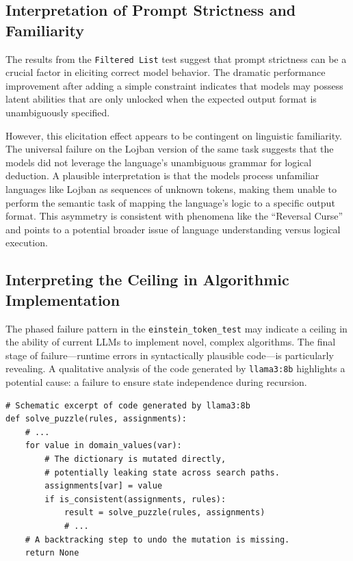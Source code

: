\documentclass[11pt]{article}
\begin{document}
\subsection{Interpretation of Prompt Strictness and Familiarity}
The results from the \texttt{Filtered List} test suggest that prompt strictness can be a crucial factor in eliciting correct model behavior. The dramatic performance improvement after adding a simple constraint indicates that models may possess latent abilities that are only unlocked when the expected output format is unambiguously specified.

However, this elicitation effect appears to be contingent on linguistic familiarity. The universal failure on the Lojban version of the same task suggests that the models did not leverage the language's unambiguous grammar for logical deduction. A plausible interpretation is that the models process unfamiliar languages like Lojban as sequences of unknown tokens, making them unable to perform the semantic task of mapping the language's logic to a specific output format. This asymmetry is consistent with phenomena like the ``Reversal Curse'' \cite{berglund2023reversal} and points to a potential broader issue of language understanding versus logical execution.

\subsection{Interpreting the Ceiling in Algorithmic Implementation}
The phased failure pattern in the \texttt{einstein\_token\_test} may indicate a ceiling in the ability of current LLMs to implement novel, complex algorithms. The final stage of failure---runtime errors in syntactically plausible code---is particularly revealing. A qualitative analysis of the code generated by \texttt{llama3:8b} highlights a potential cause: a failure to ensure state independence during recursion.

\begin{verbatim}
# Schematic excerpt of code generated by llama3:8b
def solve_puzzle(rules, assignments):
    # ...
    for value in domain_values(var):
        # The dictionary is mutated directly,
        # potentially leaking state across search paths.
        assignments[var] = value 
        if is_consistent(assignments, rules):
            result = solve_puzzle(rules, assignments)
            # ...
    # A backtracking step to undo the mutation is missing.
    return None
\end{verbatim}
\end{document}
